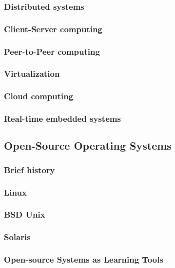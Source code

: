 \documentclass{article}
\begin{document}
\subsubsection{Distributed systems}
\subsubsection{Client-Server computing}
\subsubsection{Peer-to-Peer computing}
\subsubsection{Virtualization}
\subsubsection{Cloud computing}
\subsubsection{Real-time embedded systems}

\subsection{Open-Source Operating Systems}
\subsubsection{Brief history}
\subsubsection{Linux}
\subsubsection{BSD Unix}
\subsubsection{Solaris}
\subsubsection{Open-source Systems as Learning Tools}
\end{document}
